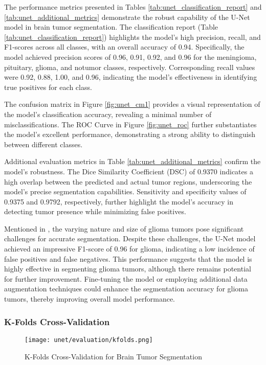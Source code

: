 The performance metrics presented in Tables \ref{tab:unet_classification_report} and \ref{tab:unet_additional_metrics} demonstrate the robust capability of the U-Net model in brain tumor segmentation. The classification report (Table \ref{tab:unet_classification_report}) highlights the model's high precision, recall, and F1-scores across all classes, with an overall accuracy of 0.94. Specifically, the model achieved precision scores of 0.96, 0.91, 0.92, and 0.96 for the meningioma, pituitary, glioma, and notumor classes, respectively. Corresponding recall values were 0.92, 0.88, 1.00, and 0.96, indicating the model's effectiveness in identifying true positives for each class.

The confusion matrix in Figure \ref{fig:unet_cm1} provides a visual representation of the model's classification accuracy, revealing a minimal number of misclassifications. The ROC Curve in Figure \ref{fig:unet_roc} further substantiates the model's excellent performance, demonstrating a strong ability to distinguish between different classes. 

Additional evaluation metrics in Table \ref{tab:unet_additional_metrics} confirm the model's robustness. The Dice Similarity Coefficient (DSC) of 0.9370 indicates a high overlap between the predicted and actual tumor regions, underscoring the model's precise segmentation capabilities. Sensitivity and specificity values of 0.9375 and 0.9792, respectively, further highlight the model's accuracy in detecting tumor presence while minimizing false positives.

Mentioned in \cite{abd-ellah_automatic_2024}, the varying nature and size of glioma tumors pose significant challenges for accurate segmentation. Despite these challenges, the U-Net model achieved an impressive F1-score of 0.96 for glioma, indicating a low incidence of false positives and false negatives. This performance suggests that the model is highly effective in segmenting glioma tumors, although there remains potential for further improvement. Fine-tuning the model or employing additional data augmentation techniques could enhance the segmentation accuracy for glioma tumors, thereby improving overall model performance.

\subsubsection{K-Folds Cross-Validation}

\begin{figure}[H]
  \begin{center}
    \texttt{[image: unet/evaluation/kfolds.png]}
  \end{center}
  \caption{K-Folds Cross-Validation for Brain Tumor Segmentation}\label{f:unet_kfolds}
\end{figure}

